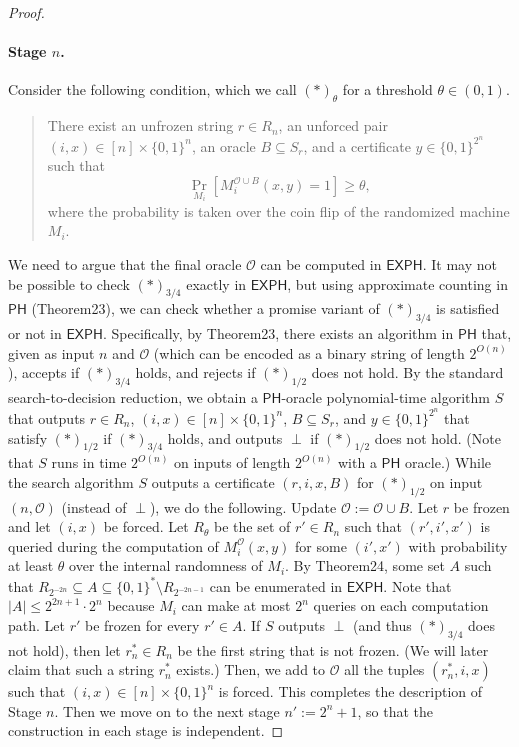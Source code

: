 \begin{proof}
\paragraph{Stage $n$.} Consider the following condition, which we call $(*)_{\theta}$ for a threshold $\theta\in(0,1)$.
\begin{quote}
There exist an unfrozen string $r\in R_n$, an unforced pair $(i,x)\in[n]\times\{0,1\}^n$, an oracle $B\subseteq S_r$, and a certificate $y\in\{0,1\}^{2^n}$ such that
\[\Pr_{M_i}[M_i^{\mathcal O\cup B}(x,y)=1]\geq\theta,\]
where the probability is taken over the coin flip of the randomized machine $M_i$.
\end{quote}
We need to argue that the final oracle $\mathcal O$ can be computed in $\mathsf{EXPH}$. It may not be possible to check $(*)_{3/4}$ exactly in $\mathsf{EXPH}$, but using approximate counting in $\mathsf{PH}$ (Theorem23), we can check whether a promise variant of $(*)_{3/4}$ is satisfied or not in $\mathsf{EXPH}$. Specifically, by Theorem23, there exists an algorithm in $\mathsf{PH}$ that, given as input $n$ and $\mathcal O$ (which can be encoded as a binary string of length $2^{O(n)}$), accepts if $(*)_{3/4}$ holds, and rejects if $(*)_{1/2}$ does not hold. By the standard search-to-decision reduction, we obtain a $\mathsf{PH}$-oracle polynomial-time algorithm $S$ that outputs $r\in R_n$, $(i,x)\in[n]\times\{0,1\}^n$, $B\subseteq S_r$, and $y\in\{0,1\}^{2^n}$ that satisfy $(*)_{1/2}$ if $(*)_{3/4}$ holds, and outputs $\perp$ if $(*)_{1/2}$ does not hold. (Note that $S$ runs in time $2^{O(n)}$ on inputs of length $2^{O(n)}$ with a $\mathsf{PH}$ oracle.)
While the search algorithm $S$ outputs a certificate $(r,i,x,B)$ for $(*)_{1/2}$ on input $(n,\mathcal O)$ (instead of $\perp$), we do the following. Update $\mathcal O:=\mathcal O\cup B$. Let $r$ be frozen and let $(i,x)$ be forced. Let $R_{\theta}$ be the set of $r'\in R_n$ such that $(r',i',x')$ is queried during the computation of $M_i^{\mathcal O}(x,y)$ for some $(i',x')$ with probability at least $\theta$ over the internal randomness of $M_i$. By Theorem24, some set $A$ such that $R_{2^{-2n}}\subseteq A\subseteq\{0,1\}^*\setminus R_{2^{-2n-1}}$ can be enumerated in $\mathsf{EXPH}$. Note that $|A|\leq2^{2n+1}\cdot2^n$ because $M_i$ can make at most $2^n$ queries on each computation path. Let $r'$ be frozen for every $r'\in A$. If $S$ outputs $\perp$ (and thus $(*)_{3/4}$ does not hold), then let $r_n^*\in R_n$ be the first string that is not frozen. (We will later claim that such a string $r_n^*$ exists.) Then, we add to $\mathcal O$ all the tuples $(r_n^*,i,x)$ such that $(i,x)\in[n]\times\{0,1\}^n$ is forced. This completes the description of Stage $n$. Then we move on to the next stage $n':=2^n+1$, so that the construction in each stage is independent.

\end{proof}
